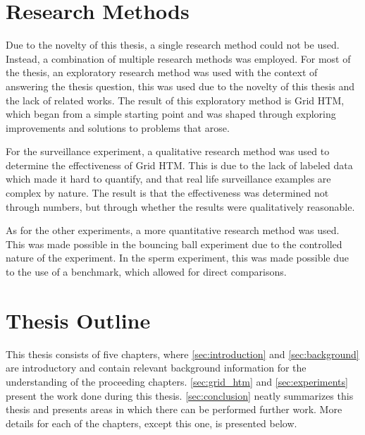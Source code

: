 \section{Research Methods}
Due to the novelty of this thesis, a single research method could not be used. Instead, a combination of multiple research methods was employed. For most of the thesis, an exploratory research method was used with the context of answering the thesis question, this was used due to the novelty of this thesis and the lack of related works. The result of this exploratory method is Grid HTM, which began from a simple starting point and was shaped through exploring improvements and solutions to problems that arose.
\par
For the surveillance experiment, a qualitative research method was used to determine the effectiveness of Grid HTM. This is due to the lack of labeled data which made it hard to quantify, and that real life surveillance examples are complex by nature. The result is that the effectiveness was determined not through numbers, but through whether the results were qualitatively reasonable.
\par
As for the other experiments, a more quantitative research method was used. This was made possible in the bouncing ball experiment due to the controlled nature of the experiment. In the sperm experiment, this was made possible due to the use of a benchmark, which allowed for direct comparisons.
\section{Thesis Outline}
This thesis consists of five chapters, where \autoref{sec:introduction} and \autoref{sec:background} are introductory and contain relevant background information for the understanding of the proceeding chapters. \autoref{sec:grid_htm} and \autoref{sec:experiments} present the work done during this thesis. \autoref{sec:conclusion} neatly summarizes this thesis and presents areas in which there can be performed further work. More details for each of the chapters, except this one, is presented below.
\par
